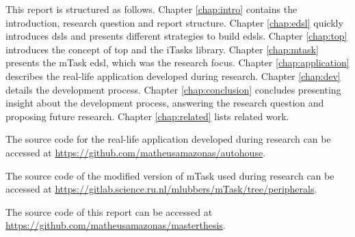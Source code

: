 This report is structured as follows. Chapter \ref{chap:intro} contains the introduction, research question and report structure. Chapter \ref{chap:edsl} quickly introduces \acp{dsl} and presents different strategies to build \acp{edsl}. Chapter \ref{chap:top} introduces the concept of \ac{top} and the iTasks library. Chapter \ref{chap:mtask} presents the mTask \ac{edsl}, which was the research focus. Chapter \ref{chap:application} describes the real-life application developed during research. Chapter \ref{chap:dev} details the development process. Chapter \ref{chap:conclusion} concludes presenting insight about the development process, answering the research question and proposing future research. Chapter \ref{chap:related} lists related work.

The source code for the real-life application developed during research can be accessed at \url{https://github.com/matheusamazonas/autohouse}.

The source code of the modified version of mTask used during research can be accessed at \url{https://gitlab.science.ru.nl/mlubbers/mTask/tree/peripherals}.

The source code of this report can be accessed at \url{https://github.com/matheusamazonas/masterthesis}.


